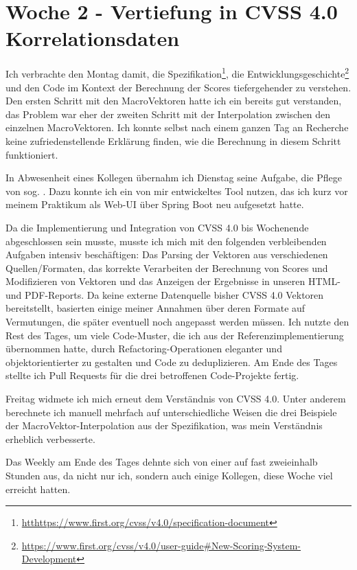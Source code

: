 \section{Woche 2 - Vertiefung in CVSS 4.0 \headerand Korrelationsdaten} \label{sec:bericht-wo-2}


\lweekdaymarginpar{\weekdayMondayLong}

Ich verbrachte den Montag damit, die Spezifikation\footnote{\url{htthttps://www.first.org/cvss/v4.0/specification-document}},
die Entwicklungsgeschichte\footnote{\url{https://www.first.org/cvss/v4.0/user-guide\#New-Scoring-System-Development}}
und den Code im Kontext der Berechnung der Scores tiefergehender zu verstehen.
Den ersten Schritt mit den MacroVektoren hatte ich ein bereits gut verstanden, das Problem war eher der zweiten Schritt mit der Interpolation zwischen den einzelnen MacroVektoren.
Ich konnte selbst nach einem ganzen Tag an Recherche keine zufriedenstellende Erklärung finden, wie die Berechnung in diesem Schritt funktioniert.

\sweekdaymarginpar{\weekdayTuesdayShort, \weekdayWednesdayShort}

In Abwesenheit eines Kollegen übernahm ich Dienstag seine Aufgabe, die Pflege von sog. .
Dazu konnte ich ein von mir entwickeltes Tool nutzen, das ich kurz vor meinem Praktikum als Web-UI über Spring Boot neu aufgesetzt hatte.

\sweekdaymarginpar{\weekdayThursdayLong}

Da die Implementierung und Integration von CVSS 4.0 bis Wochenende abgeschlossen sein musste, musste ich mich mit den folgenden verbleibenden Aufgaben intensiv beschäftigen:
Das Parsing der Vektoren aus verschiedenen Quellen/Formaten, das korrekte Verarbeiten der Berechnung von Scores und Modifizieren von Vektoren und das Anzeigen der Ergebnisse in unseren HTML- und PDF-Reports.
Da keine externe Datenquelle bisher CVSS 4.0 Vektoren bereitstellt, basierten einige meiner Annahmen über deren Formate auf Vermutungen, die später eventuell noch angepasst werden müssen.
Ich nutzte den Rest des Tages, um viele Code-Muster, die ich aus der Referenzimplementierung übernommen hatte, durch Refactoring-Operationen eleganter und objektorientierter zu gestalten und Code zu deduplizieren.
Am Ende des Tages stellte ich Pull Requests für die drei betroffenen Code-Projekte fertig.

\sweekdaymarginpar{\weekdayFridayLong}

Freitag widmete ich mich erneut dem Verständnis von CVSS 4.0.
Unter anderem berechnete ich manuell mehrfach auf unterschiedliche Weisen die drei Beispiele der MacroVektor-Interpolation aus der Spezifikation, was mein Verständnis erheblich verbesserte.

Das Weekly am Ende des Tages dehnte sich von einer auf fast zweieinhalb Stunden aus, da nicht nur ich, sondern auch einige Kollegen, diese Woche viel erreicht hatten.
